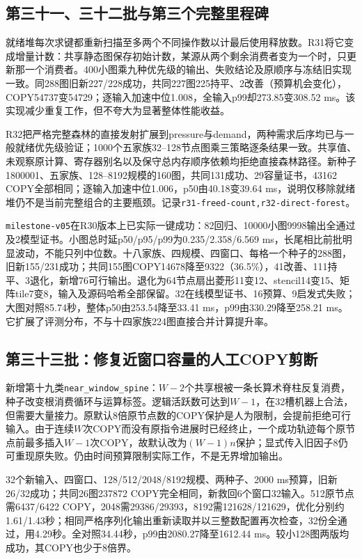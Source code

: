 \documentclass[UTF8,11pt,fontset=fandol]{ctexart}
\begin{document}
\subsection{第三十一、三十二批与第三个完整里程碑}
就绪堆每次求键都重新扫描至多两个不同操作数以计最后使用释放数。R31将它变成增量计数：共享静态图保存初始计数，某源从两个剩余消费者变为一个时，只更新那一个消费者。400小图乘九种优先级的输出、失败结论及原顺序与冻结旧实现一致。同288图旧新227/228成功，共同227图225持平、2改善（预算机会变化），COPY54737变54729；逐输入加速中位1.008，全输入p99却273.85变308.52 ms。该实现减少重复工作，但不夸大为显著整体性能收益。

R32把严格完整森林的直接发射扩展到pressure与demand，两种需求后序均已与一般就绪优先级验证；1000个五家族32--128节点图乘三策略逐条结果一致。共享值、未观察原计算、寄存器别名以及保守总内存顺序依赖均拒绝直接森林路径。新种子1800001、五家族、128--8192规模的160图，共同131成功、29容量证书，43162 COPY全部相同；逐输入加速中位1.006，p50由40.18变39.64 ms，说明仅移除就绪堆仍不是当前完整组合的主要瓶颈。记录\texttt{r31-freed-count,r32-direct-forest}。

\texttt{milestone-v05}在R30版本上已实际一键成功：82回归、10000小图9998输出全通过及2模型证书。小图总时延p50/p95/p99为0.235/2.358/6.569 ms，长尾相比前批明显波动，不能只列中位数。十八家族、四规模、四窗口、每格一个种子的288图，旧新155/231成功；共同155图COPY14678降至9322（36.5\%），41改善、111持平、3退化，新增76可行输出。退化为64节点扇出菱形11变12、stencil14变15、矩阵tile7变8，输入及源码哈希全部保留。32在线模型证书、16预算、9启发式失败；大图对照85.74秒，整体p50由253.54降至33.41 ms，p99由330.29降至258.21 ms。它扩展了评测分布，不与十四家族224图直接合并计算提升率。

\subsection{第三十三批：修复近窗口容量的人工COPY剪断}
新增第十九类\texttt{near\_window\_spine}：$W-2$个共享根被一条长算术脊柱反复消费，种子改变根消费循环与运算标签。逻辑活跃数可达到$W-1$，在32槽机器上合法，但需要大量接力。原默认8倍原节点数的COPY保护是人为限制，会提前拒绝可行输入。由于连续$W$次COPY而没有原指令进展时已经终止，一个成功轨迹每个原节点前最多插入$W-1$次COPY，故默认改为$(W-1)n$保护；显式传入旧因子8仍可重现原失败。仍由时间预算限制实际工作，不是无界增加输出。

32个新输入、四窗口、128/512/2048/8192规模、两种子、2000 ms预算，旧新26/32成功；共同26图237872 COPY完全相同，新救回6个窗口32输入。512原节点需6437/6422 COPY，2048需29386/29393，8192需121628/121629，优化分别约1.61/1.43秒；相同严格序列化输出重新读取并以三整数配置再次检查，32份全通过，用4.29秒。全对照34.44秒，p99由2080.27降至1612.44 ms。较小128图两版均成功，其COPY也少于8倍界。
\end{document}
